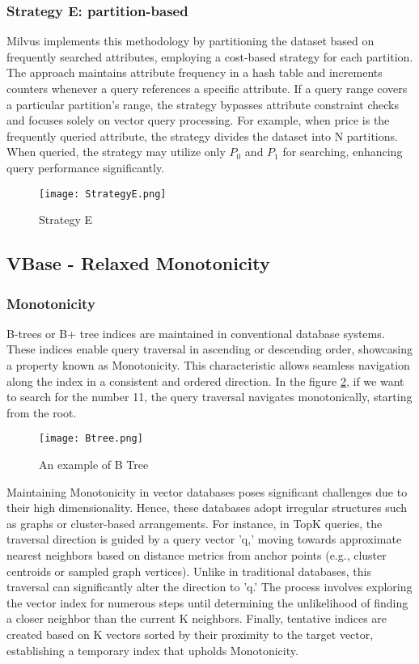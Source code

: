 \documentclass[conference]{IEEEtran}
\begin{document}
\subsubsection{Strategy E: partition-based}\cite{10.1145/3448016.3457550}
Milvus implements this methodology by partitioning the dataset based on frequently searched attributes, employing a cost-based strategy for each partition. The approach maintains attribute frequency in a hash table and increments counters whenever a query references a specific attribute. If a query range covers a particular partition's range, the strategy bypasses attribute constraint checks and focuses solely on vector query processing. For example, when price is the frequently queried attribute, the strategy divides the dataset into N partitions. When queried, the strategy may utilize only $P_0$ and $P_1$ for searching, enhancing query performance significantly.
\begin{figure}[h!]
  \centering
  \texttt{[image: StrategyE.png]}
  \caption{Strategy E}
  \label{fig: Strategy E}
\end{figure}

\subsection{VBase - Relaxed Monotonicity}

\subsubsection{Monotonicity}

B-trees or B+ tree indices are maintained in conventional database systems. These indices enable query traversal in ascending or descending order, showcasing a property known as Monotonicity. This characteristic allows seamless navigation along the index in a consistent and ordered direction. In the figure \ref{fig: BTree}, if we want to search for the number 11, the query traversal navigates monotonically, starting from the root.


\begin{figure}[h!]
  \centering
  \texttt{[image: Btree.png]}
  \caption{An example of B Tree \cite{sudiksha-2021}}
  \label{fig: BTree}
\end{figure}

Maintaining Monotonicity in vector databases poses significant challenges due to their high dimensionality. Hence, these databases adopt irregular structures such as graphs or cluster-based arrangements. For instance, in TopK queries, the traversal direction is guided by a query vector 'q,' moving towards approximate nearest neighbors based on distance metrics from anchor points (e.g., cluster centroids or sampled graph vertices). Unlike in traditional databases, this traversal can significantly alter the direction to 'q.' The process involves exploring the vector index for numerous steps until determining the unlikelihood of finding a closer neighbor than the current K neighbors. Finally, tentative indices are created based on K vectors sorted by their proximity to the target vector, establishing a temporary index that upholds Monotonicity. 
\\
\end{document}
